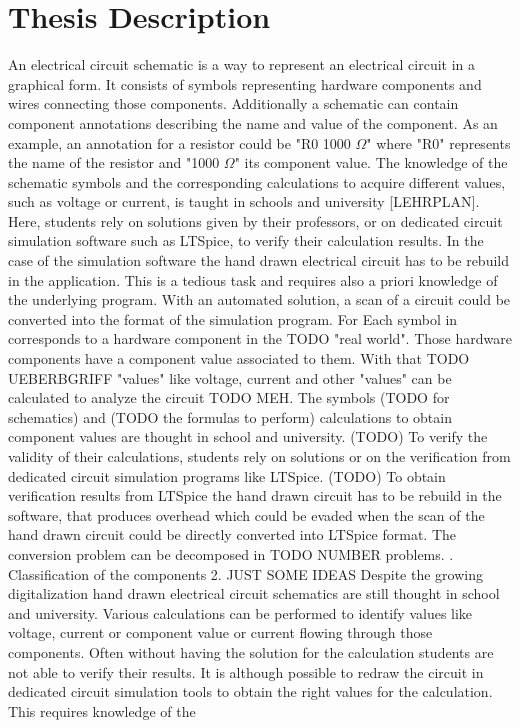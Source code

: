\documentclass{article}%
\begin{document}
\section*{Thesis Description}
An electrical circuit schematic is a way to represent an electrical circuit in a graphical form. It consists of symbols representing hardware components and wires connecting those components. Additionally a schematic can contain component annotations describing the name and value of the component. As an example, an annotation for a resistor could be "R0 1000 $\Omega$" where "R0" represents the name of the resistor and "1000 $\Omega$" its component value.
\lf
The knowledge of the schematic symbols and the corresponding calculations to acquire different values, such as voltage or current, is taught in schools and university [LEHRPLAN]. Here, students rely on solutions given by their professors, or on dedicated circuit simulation software such as LTSpice, to verify their calculation results. In the case of the simulation software the hand drawn electrical circuit has to be rebuild in the application. This is a tedious task and requires also a priori knowledge of the underlying program. With an automated solution, a scan of a circuit could be converted into the format of the simulation program.
\lf
For
\lf
Each symbol in corresponds to a hardware component in the TODO "real world". Those hardware components have a component value associated to them. With that TODO UEBERBGRIFF "values" like voltage, current and other "values" can be calculated to analyze the circuit TODO MEH. The symbols (TODO for schematics) and (TODO the formulas to perform) calculations to obtain component values are thought in school and university. (TODO) To verify the validity of their calculations, students rely on solutions or on the verification from dedicated circuit simulation programs like LTSpice. (TODO) To obtain verification results from LTSpice the hand drawn circuit has to be rebuild in the software, that produces overhead which could be evaded when the scan of the hand drawn circuit could be directly converted into LTSpice format.
\lf
The conversion problem can be decomposed in TODO NUMBER problems.
. Classification of the components
2.
\lf
JUST SOME IDEAS
\lf
Despite the growing digitalization hand drawn electrical circuit schematics are still thought in school and university. Various calculations can be performed to identify values like voltage, current or component value or current flowing through those components. Often without having the solution for the calculation students are not able to verify their results. It is although possible to redraw the circuit in dedicated circuit simulation tools to obtain the right values for the calculation. This requires knowledge of the
\end{document}
